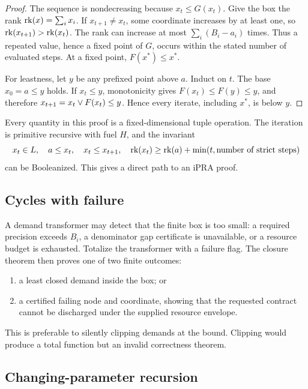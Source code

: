 \begin{proof}
The sequence is nondecreasing because \(x_t\le G(x_t)\).  Give the box the rank
\(\operatorname{rk}(x)=\sum_i x_i\).  If \(x_{t+1}\ne x_t\), some coordinate increases by
at least one, so \(\operatorname{rk}(x_{t+1})>\operatorname{rk}(x_t)\).  The rank can increase at most
\(\sum_i(B_i-a_i)\) times.  Thus a repeated value, hence a fixed point of
\(G\), occurs within the stated number of evaluated steps.  At a fixed point,
\(F(x^*)\le x^*\).

For leastness, let \(y\) be any prefixed point above \(a\).  Induct on \(t\).
The base \(x_0=a\le y\) holds.  If \(x_t\le y\), monotonicity gives
\(F(x_t)\le F(y)\le y\), and therefore
\(x_{t+1}=x_t\mathbin{\vee} F(x_t)\le y\).  Hence every iterate, including \(x^*\), is
below \(y\).
\end{proof}

Every quantity in this proof is a fixed-dimensional tuple operation.  The
iteration is primitive recursive with fuel \(H\), and the invariant
\[
 x_t\in L,\quad a\le x_t,\quad x_t\le x_{t+1},\quad
 \operatorname{rk}(x_t)\ge\operatorname{rk}(a)+\min(t,\text{number of strict steps})
\]
can be Booleanized.  This gives a direct path to an iPRA proof.

\subsection{Cycles with failure}

A demand transformer may detect that the finite box is too small: a required
precision exceeds \(B_i\), a denominator gap certificate is unavailable, or a
resource budget is exhausted.  Totalize the transformer with a failure flag.
The closure theorem then proves one of two finite outcomes:

\begin{enumerate}
\item a least closed demand inside the box; or
\item a certified failing node and coordinate, showing that the requested
contract cannot be discharged under the supplied resource envelope.
\end{enumerate}

This is preferable to silently clipping demands at the bound.  Clipping would
produce a total function but an invalid correctness theorem.

\subsection{Changing-parameter recursion}

